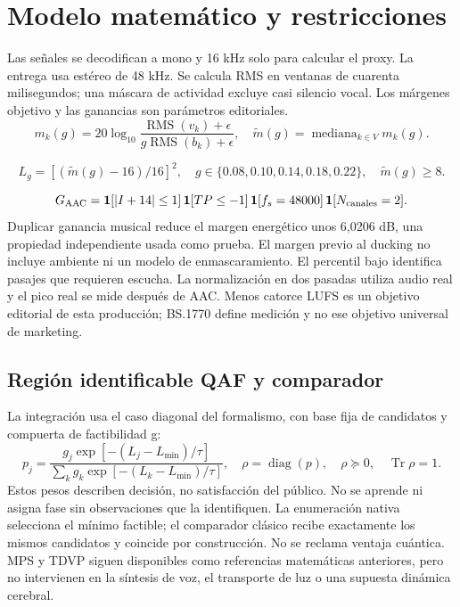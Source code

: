 \documentclass[10pt,a4paper]{article}
\begin{document}
\section{Modelo matemático y restricciones}
Las señales se decodifican a mono y 16 kHz solo para calcular el proxy. La entrega usa estéreo de 48 kHz. Se calcula RMS en ventanas de cuarenta milisegundos; una máscara de actividad excluye casi silencio vocal. Los márgenes objetivo y las ganancias son parámetros editoriales.
\begin{equation}m_k(g)=20\log_{10}\frac{\operatorname{RMS}(v_k)+\epsilon}{g\operatorname{RMS}(b_k)+\epsilon},\quad\widetilde m(g)=\operatorname{mediana}_{k\in V}m_k(g).\end{equation}

\begin{equation}L_g=[(\widetilde m(g)-16)/16]^2,\quad g\in\{0.08,0.10,0.14,0.18,0.22\},\quad\widetilde m(g)\geq8.\end{equation}

\begin{equation}G_{\rm AAC}=\mathbf1[|I+14|\leq1]\,\mathbf1[TP\leq-1]\,\mathbf1[f_s=48000]\,\mathbf1[N_{\rm canales}=2].\end{equation}
Duplicar ganancia musical reduce el margen energético unos 6,0206 dB, una propiedad independiente usada como prueba. El margen previo al ducking no incluye ambiente ni un modelo de enmascaramiento. El percentil bajo identifica pasajes que requieren escucha. La normalización en dos pasadas utiliza audio real y el pico real se mide después de AAC. Menos catorce LUFS es un objetivo editorial de esta producción; BS.1770 define medición y no ese objetivo universal de marketing.
\subsection{Región identificable QAF y comparador}
La integración usa el caso diagonal del formalismo, con base fija de candidatos y compuerta de factibilidad g:
\begin{equation}
p_j=\frac{g_j\exp[-(L_j-L_{\min})/\tau]}{\sum_k g_k\exp[-(L_k-L_{\min})/\tau]},\quad\rho=\operatorname{diag}(p),\quad\rho\succeq0,\quad\operatorname{Tr}\rho=1.
\end{equation}
Estos pesos describen decisión, no satisfacción del público. No se aprende ni asigna fase sin observaciones que la identifiquen. La enumeración nativa selecciona el mínimo factible; el comparador clásico recibe exactamente los mismos candidatos y coincide por construcción. No se reclama ventaja cuántica. MPS y TDVP siguen disponibles como referencias matemáticas anteriores, pero no intervienen en la síntesis de voz, el transporte de luz o una supuesta dinámica cerebral.
\end{document}
